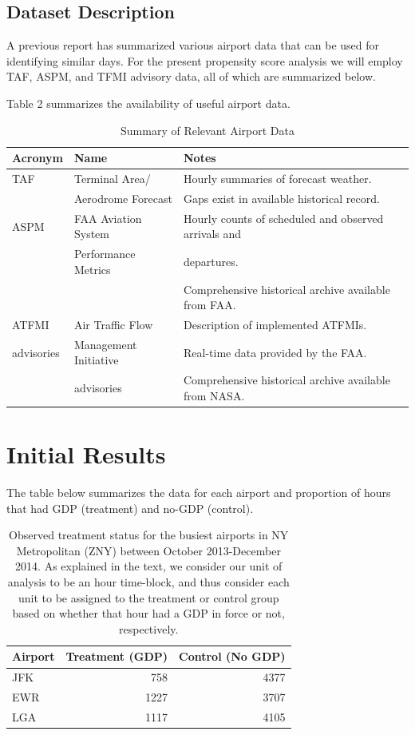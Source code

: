 \documentclass[11pt]{scrartcl}
\begin{document}
\subsection*{Dataset Description}
A previous report has summarized various airport data that can be used for identifying similar days.  For the present propensity score analysis we will employ TAF, ASPM, and TFMI advisory data, all of which are summarized below.

Table 2 summarizes the availability of useful airport data.

\begin{table}[h!]
\begin{center}
\begin{tabular}{|l|l|l|}
\hline
{\bf Acronym} & {\bf Name} & {\bf Notes}\\
\hline
TAF & Terminal Area/& Hourly summaries of forecast weather.\\
& Aerodrome Forecast & Gaps exist in available historical record.\\
\hline
ASPM & FAA Aviation System & Hourly counts of scheduled and observed arrivals and\\
& Performance Metrics & departures.\\
& & Comprehensive historical archive available from FAA.\\
\hline
ATFMI & Air Traffic Flow & Description of implemented ATFMIs.\\
advisories & Management Initiative & Real-time data provided by the FAA.\\
& advisories & Comprehensive historical archive available from NASA.\\
\hline
\end{tabular}
\caption{Summary of Relevant Airport Data}
\end{center}
\label{default}
\end{table}
  

\section*{Initial Results}
The table below summarizes the data for each airport and proportion of hours that had GDP (treatment) and no-GDP (control).

\begin{table}[h!]
\centering
\begin{tabular}{lrr}
\hline
Airport & Treatment (GDP) & Control (No GDP)\\
\hline
JFK & 758 & 4377 \\
EWR & 1227 & 3707 \\
LGA & 1117 & 4105 \\
\hline
\end{tabular}
\caption{Observed treatment status for the busiest airports in NY Metropolitan (ZNY) between October 2013-December 2014.  As explained in the text, we consider our unit of analysis to be an hour time-block, and thus consider each unit to be assigned to the treatment or control group based on whether that hour had a GDP in force or not, respectively.}
\label{tab:ap_treat_size}
\end{table}
\end{document}
